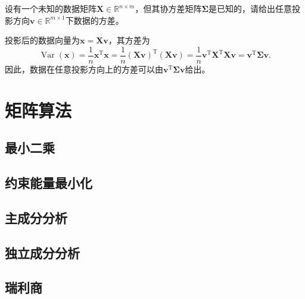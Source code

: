 \begin{example}
    设有一个未知的数据矩阵\( \mathbf{X} \in \mathbb{R}^{n \times m} \)，但其协方差矩阵\( \mathbf{\Sigma} \)是已知的，请给出任意投影方向\( \bm{v} \in \mathbb{R}^{m \times 1} \)下数据的方差。
\end{example}
\begin{solution}
    投影后的数据向量为\(\bm{x} = \mathbf{X} \bm{v}  \)，其方差为
    \[
        \operatorname{Var}(\bm{x}) = \frac{1}{n} \bm{x}^{\mathrm{T}} \bm{x} = \frac{1}{n} (\mathbf{X} \bm{v})^{\mathrm{T}} (\mathbf{X} \bm{v}) = \frac{1}{n} \bm{v}^{\mathrm{T}} \mathbf{X}^{\mathrm{T}} \mathbf{X} \bm{v} = \bm{v}^{\mathrm{T}} \mathbf{\Sigma} \bm{v}.
    \]
    因此，数据在任意投影方向上的方差可以由\( \bm{v}^{\mathrm{T}} \mathbf{\Sigma} \bm{v} \)给出。
\end{solution}

\section{矩阵算法}

\subsection{最小二乘}

\subsection{约束能量最小化}

\subsection{主成分分析}

\subsection{独立成分分析}

\subsection{瑞利商}

